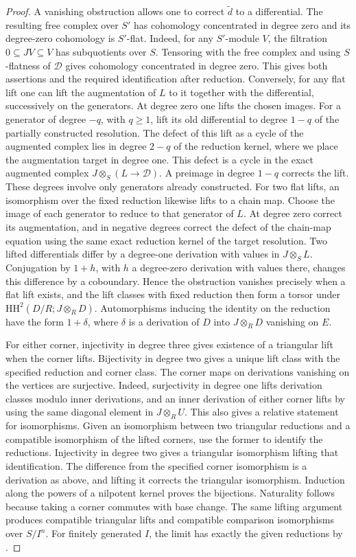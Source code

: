 \documentclass[12pt,a4paper,english,reqno]{amsart}
\numberwithin{equation}{section}
\theoremstyle{plain}
\theoremstyle{definition}
\begin{document}
\begin{proof}
A vanishing obstruction allows one to correct $\widetilde d$
to a differential. The resulting free complex over $S'$ has
cohomology concentrated in degree zero and its degree-zero
cohomology is $S'$-flat. Indeed, for any $S'$-module $V$, the
filtration $0\subseteq JV\subseteq V$ has subquotients over
$S$. Tensoring with the free complex and using
$S$-flatness of $\mathcal D$ gives cohomology concentrated in
degree zero. This gives both assertions and the required
identification after reduction. Conversely, for any flat lift
one can lift the augmentation of $L$ to it together with the
differential, successively on the generators. At degree zero
one lifts the chosen images. For a generator of degree $-q$, with $q\geq1$, lift its old
differential to degree $1-q$ of the partially constructed
resolution. The defect of this lift as a cycle of the augmented
complex lies in degree $2-q$ of the reduction kernel, where
we place the augmentation target in degree one. This defect is
a cycle in the exact augmented complex
$J\otimes_S(L\to\mathcal D)$. A preimage in degree $1-q$
corrects the lift. These degrees involve only generators
already constructed. For two flat lifts, an isomorphism over
the fixed reduction likewise lifts to a chain map. Choose
the image of each generator to reduce to that generator of $L$.
At degree zero correct its augmentation, and in negative
degrees correct the defect of the chain-map equation using
the same exact reduction kernel of the target resolution. Two lifted differentials differ by a degree-one
derivation with values in $J\otimes_S L$. Conjugation by $1+h$,
with $h$ a degree-zero derivation with values there, changes this
difference by a coboundary. Hence the obstruction vanishes
precisely when a flat lift exists, and the lift classes with
fixed reduction then form a torsor under
$\mathrm{HH}^{2}(D/R;J\otimes_R D)$. Automorphisms inducing the
identity on the reduction have the form $1+\delta$, where
$\delta$ is a derivation of $D$ into $J\otimes_R D$ vanishing on $E$.

For either corner, injectivity in degree three gives existence
of a triangular lift when the corner lifts. Bijectivity in
degree two gives a unique lift class with the specified reduction
and corner class. The corner maps on derivations vanishing on
the vertices are surjective. Indeed, surjectivity in degree one
lifts derivation classes modulo inner derivations, and an
inner derivation of either corner lifts by using the same
diagonal element in $J\otimes_R U$. This also gives a relative
statement for isomorphisms. Given an isomorphism between two
triangular reductions and a compatible isomorphism of the
lifted corners, use the former to identify the reductions.
Injectivity in degree two gives a triangular isomorphism lifting
that identification. The difference from the specified corner
isomorphism is a derivation as above, and lifting it corrects
the triangular isomorphism. Induction along the powers of a
nilpotent kernel proves the bijections. Naturality follows
because taking a corner commutes with base change. The same
lifting argument produces compatible triangular lifts and
compatible comparison isomorphisms over $S/I^n$.
For finitely generated $I$, the limit has exactly the given
reductions by \cite[Tag \texttt{09B8}]{StacksProject}.


\end{proof}
\end{document}
